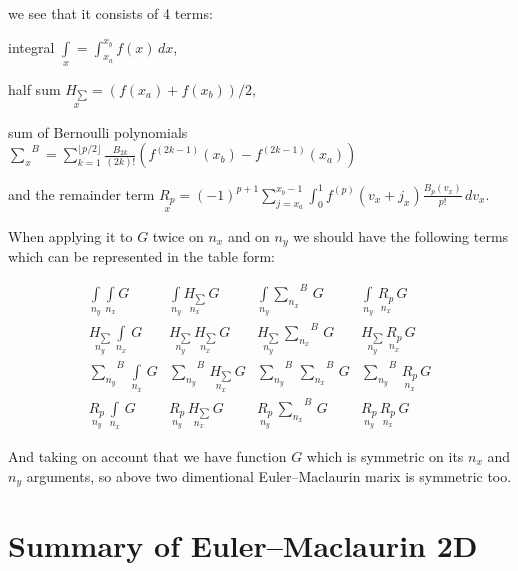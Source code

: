 \documentclass[11pt]{article}
\begin{document}
we see that it consists of 4 terms:

integral \(\int\limits_{x}^{}=\int _{x_a}^{x_b}f(x)\,dx\),

half sum \(\underset{x}{H_{\sum}}={\left( {f(x_a)+f(x_b)}\right)/{2}}\),

sum of Bernoulli polynomials
\({\sum\limits_{x}^{}}^{B}=\sum _{k=1}^{\lfloor p/2\rfloor }{\frac {B_{2k}}{(2k)!}}\left(f^{(2k-1)}(x_b)-f^{(2k-1)}(x_a)\right)\)

and the remainder term
\(\underset{x}{R_{p}}=(-1)^{p+1}\sum_{j=x_a}^{x_b-1} \int _{0}^{1}f^{(p)}(v_x+j_x){\frac {B_{p}(v_x)}{p!}}\,dv_x\).

When applying it to \(G\) twice on \(n_x\) and on \(n_y\) we should have
the following terms which can be represented in the table form:

    \begin{equation}
\begin{array}{cccc}
 \int\limits_{n_y}^{} \int\limits_{n_x}^{} G  &  \int\limits_{n_y}^{} \underset{n_x}{H_{\sum}}\,G  &  \int\limits_{n_y}^{}{\sum\limits_{n_x}^{}}^{B}\,G  &  \int\limits_{n_y}^{}\,\underset{n_x}{R_{p}}\,G  \\
 \underset{n_y}{H_{\sum}}\,\int\limits_{n_x}^{}\,G &  \underset{n_y}{H_{\sum}}\,\underset{n_x}{H_{\sum}}\,G &  \underset{n_y}{H_{\sum}}\,{\sum\limits_{n_x}^{}}^{B}\,G &  \underset{n_y}{H_{\sum}}\,\underset{n_x}{R_{p}}\,G \\
 {\sum\limits_{n_y}^{}}^{B}\,\int\limits_{n_x}^{}\,G  &  {\sum\limits_{n_y}^{}}^{B}\,\underset{n_x}{H_{\sum}}\,G  &  {\sum\limits_{n_y}^{}}^{B}\,{\sum\limits_{n_x}^{}}^{B}\,G  &  {\sum\limits_{n_y}^{}}^{B}\,\underset{n_x}{R_{p}}\,G  \\
 \underset{n_y}{R_{p}}\,\int\limits_{n_x}^{}\,G   &  \underset{n_y}{R_{p}}\,\underset{n_x}{H_{\sum}}\,G   &  \underset{n_y}{R_{p}}\,{\sum\limits_{n_x}^{}}^{B}\,G   &  \underset{n_y}{R_{p}}\,\underset{n_x}{R_{p}}\,G
\end{array}\end{equation}

    And taking on account that we have function \(G\) which is symmetric on
its \(n_x\) and \(n_y\) arguments, so above two dimentional
Euler--Maclaurin marix is symmetric too.

    \section{Summary of Euler--Maclaurin
2D}\label{summary-of-eulermaclaurin-2d}
\end{document}
